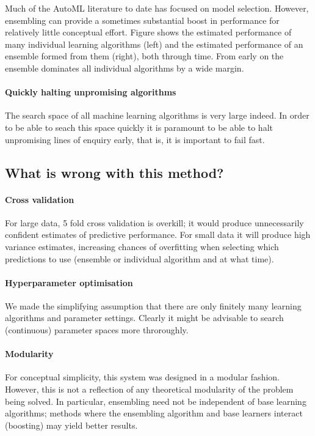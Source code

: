 \documentclass{article} %
\begin{document}
Much of the AutoML literature to date has focused on model selection.
However, ensembling can provide a sometimes substantial boost in performance for relatively little conceptual effort.
Figure shows the estimated performance of many individual learning algorithms (left) and the estimated performance of an ensemble formed from them (right), both through time.
From early on the ensemble dominates all individual algorithms by a wide margin.

\paragraph{Quickly halting unpromising algorithms}

The search space of all machine learning algorithms is very large indeed.
In order to be able to seach this space quickly it is paramount to be able to halt unpromising lines of enquiry early, that is, it is important to fail fast.

\subsection{What is wrong with this method?}

\paragraph{Cross validation}

For large data, 5 fold cross validation is overkill; it would produce unnecessarily confident estimates of predictive performance.
For small data it will produce high variance estimates, increasing chances of overfitting when selecting which predictions to use (ensemble or individual algorithm and at what time).

\paragraph{Hyperparameter optimisation}

We made the simplifying assumption that there are only finitely many learning algorithms and parameter settings.
Clearly it might be advisable to search (continuous) parameter spaces more throroughly.

\paragraph{Modularity}

For conceptual simplicity, this system was designed in a modular fashion.
However, this is not a reflection of any theoretical modularity of the problem being solved.
In particular, ensembling need not be independent of base learning algorithms; methods where the ensembling algorithm and base learners interact (\eg boosting) may yield better results.
\end{document}

